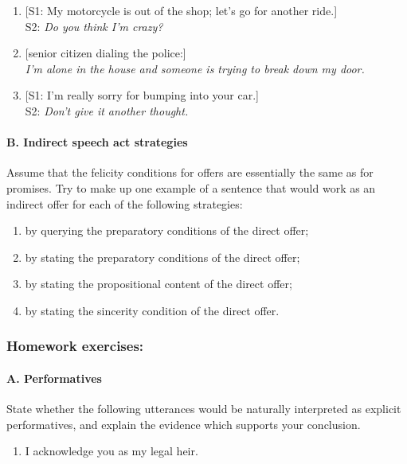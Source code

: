 \begin{enumerate}
\item{} [S1: My motorcycle is out of the shop; let’s go for another ride.]\\
S2: \textit{Do you think I’m crazy?}
\item{} [senior citizen dialing the police:]\\
\textit{I’m alone in the house and someone is trying to break down my door.}
\item{} [S1: I’m really sorry for bumping into your car.]\\
S2: \textit{Don’t give it another thought.}
\end{enumerate}
\paragraph{B. Indirect speech act strategies}

Assume that the felicity conditions for offers are essentially the same as for promises. Try to make up one example of a sentence that would work as an indirect offer for each of the following strategies:

\begin{enumerate}
\item by querying the preparatory conditions of the direct offer;
\item by stating the preparatory conditions of the direct offer;
\item by stating the propositional content of the direct offer;
\item by stating the sincerity condition of the direct offer.
\end{enumerate}
\subsubsection{Homework exercises:}\footnotemark{}\label{sec:}
\paragraph{A. Performatives}

State whether the following utterances would be naturally interpreted as explicit performatives, and explain the evidence which supports your conclusion.

\begin{enumerate}
\item \rmfamily
I acknowledge you as my legal heir.
\end{enumerate}

